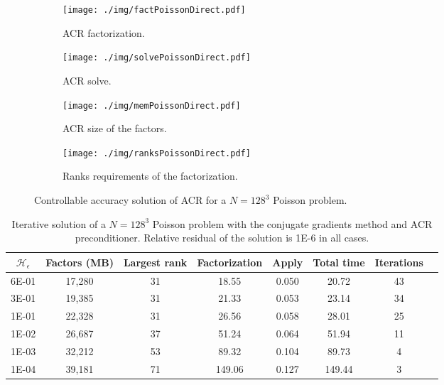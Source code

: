 \documentclass[]{elsarticle}
\begin{document}
\begin{figure}[]
	\centering
	\begin{subfigure}{.4\textwidth}
		\centering
		\texttt{[image: ./img/factPoissonDirect.pdf]}
		\caption{ACR factorization.}
		\label{fig:directFact}
	\end{subfigure}
	\begin{subfigure}{.4\textwidth}
		\centering
		\texttt{[image: ./img/solvePoissonDirect.pdf]}
		\caption{ACR solve.}
		\label{fig:directSolve}
	\end{subfigure}
	\begin{subfigure}{0.4\textwidth}
		\centering
		\texttt{[image: ./img/memPoissonDirect.pdf]}
		\caption{ACR size of the factors.}
		\label{fig:directMem}
	\end{subfigure}
		\begin{subfigure}{.4\textwidth}
		\centering
		\texttt{[image: ./img/ranksPoissonDirect.pdf]}
		\caption{Ranks requirements of the factorization.}
		\label{fig:directRank}
	\end{subfigure}
\caption{Controllable accuracy solution of ACR for a $N=128^3$ Poisson problem.}
\label{fig:controlAccuracy} 
\end{figure}

\begin{table}[]
\centering
\begin{tabular}{|l|c|c|c|c|c|c|c|}
\hline
\multicolumn{1}{|c|}{$\mathcal{H}_{\epsilon}$} & \textbf{Factors (MB)} & \textbf{Largest rank} & \textbf{Factorization} & \textbf{Apply} & \textbf{Total time} & \textbf{Iterations} \\ \hline
6E-01                              & 17,280                & 31                 & 18.55                  & 0.050          & 20.72               & 43                  \\ \hline
3E-01                              & 19,385                & 31                 & 21.33                  & 0.053          & 23.14               & 34                  \\ \hline
1E-01                              & 22,328                & 31                 & 26.56                  & 0.058          & 28.01               & 25                  \\ \hline
1E-02                              & 26,687                & 37                 & 51.24                  & 0.064          & 51.94               & 11                  \\ \hline
1E-03                              & 32,212                & 53                 & 89.32                  & 0.104          & 89.73               & 4                   \\ \hline
1E-04                              & 39,181                & 71                 & 149.06                 & 0.127          & 149.44              & 3                   \\ \hline
\end{tabular}
\caption{Iterative solution of a $N=128^3$ Poisson problem with the conjugate gradients method and ACR preconditioner. Relative residual of the solution is 1E-6 in all cases.}
\label{table:precond}
\end{table}
\end{document}

